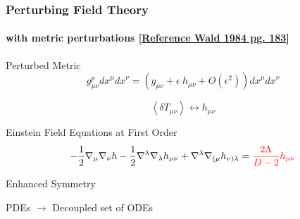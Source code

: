 \documentclass[xcolor=dvipsnames]{beamer}
\begin{document}
\begin{frame}
  \frametitle{Perturbing Field Theory}
  \framesubtitle{with metric perturbations [\href{https://inspirehep.net/literature/209356}{Reference Wald 1984 pg. 183}]}

  \begin{block}{Perturbed Metric}
    \begin{equation*}
      g^{p}_{\mu\nu} {dx}^\mu {dx}^\nu = \left(g_{\mu\nu}+\epsilon~h_{\mu\nu}+O(\epsilon^2)\right) {dx}^\mu {dx}^\nu
    \end{equation*}

    \begin{equation*}
      \left\langle \delta T_{\mu\nu}\right\rangle\longleftrightarrow h_{\mu\nu}
    \end{equation*}
  \end{block}

  \begin{block}{Einstein Field Equations at First Order}
    \begin{equation*}
      -\frac{1}{2}\nabla_\mu \nabla_\nu h-\frac{1}{2}\nabla^\lambda \nabla_\lambda h_{\mu\nu}+\nabla^\lambda \nabla_{(\mu}h_{\nu)\lambda} = \textcolor{red}{\frac{2\Lambda}{D-2}h_{\mu\nu}}
    \end{equation*}
  \end{block}


  \begin{block}{Enhanced Symmetry}
    \begin{center}PDEs $\rightarrow$ Decoupled set of ODEs\end{center}
  \end{block}

\end{frame}
\end{document}
